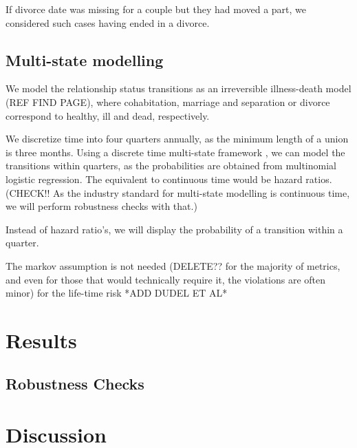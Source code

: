 \documentclass[a4paper,12pt,bibliography=totoc,numbers=noenddot,sfdefaults=false,abstract=true,notitlepage]{scrartcl} %
\begin{document}
	If divorce date was missing for a couple but they had moved a part, we considered such cases having ended in a divorce.
	
	\subsection{Multi-state modelling}
	
	We model the relationship status transitions as an irreversible illness-death model \autocite{cookMultistateModelsAnalysis2017} (REF FIND PAGE), where cohabitation, marriage and separation or divorce correspond to healthy, ill and dead, respectively.
	
	We discretize time into four quarters annually, as the minimum length of a union is three months. Using a discrete time multi-state framework \autocite{dudelet.al.DiscretetimeMultistateModelsUpcoming}, we can model the transitions within quarters, as the probabilities are obtained from multinomial logistic regression. The equivalent to continuous time would be hazard ratios. (CHECK!! As the industry standard for multi-state modelling is continuous time, we will perform robustness checks with that.)
	
	
	Instead of hazard ratio's, we will display the probability of a transition within a quarter. 
	
	The markov assumption is not needed (DELETE?? for the majority of metrics, and even for those that would technically require it, the violations are often minor) for the life-time risk *ADD DUDEL ET AL* %
	
	
	\section{Results}\label{results}
	
	
	
	
	\subsection{Robustness Checks}\label{robustness_checks}
	
	
	
	
	\section{Discussion}\label{discussion}
	
\end{document}

